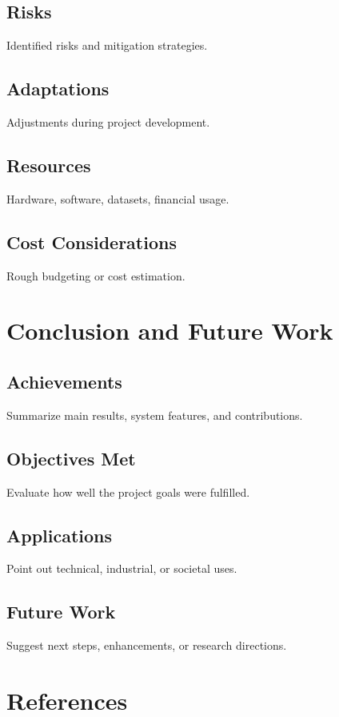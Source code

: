 \documentclass[12pt]{article}
\begin{document}
\subsection{Risks}
Identified risks and mitigation strategies.

\subsection{Adaptations}
Adjustments during project development.

\subsection{Resources}
Hardware, software, datasets, financial usage.

\subsection{Cost Considerations}
Rough budgeting or cost estimation.

\section{Conclusion and Future Work}

\subsection{Achievements}
Summarize main results, system features, and contributions.

\subsection{Objectives Met}
Evaluate how well the project goals were fulfilled.

\subsection{Applications}
Point out technical, industrial, or societal uses.

\subsection{Future Work}
Suggest next steps, enhancements, or research directions.

\newpage
\section*{References}
\end{document}
